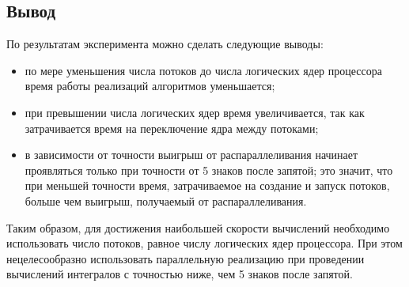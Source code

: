\clearpage

\subsection*{Вывод}
По результатам эксперимента можно сделать следующие выводы:
\begin{itemize}[label=---]
    \item по мере уменьшения числа потоков до числа логических ядер процессора время работы реализаций алгоритмов уменьшается;
    \item при превышении числа логических ядер время увеличивается, так как затрачивается время на переключение ядра между потоками;
    \item в зависимости от точности выигрыш от распараллеливания начинает проявляться только при точности от 5 знаков после запятой; это значит, что при меньшей точности время, затрачиваемое на создание и запуск потоков, больше чем выигрыш, получаемый от распараллеливания.
\end{itemize}

Таким образом, для достижения наибольшей скорости вычислений необходимо использовать число потоков, равное числу логических ядер процессора. При этом нецелесообразно использовать параллельную реализацию при проведении вычислений интегралов с точностью ниже, чем 5 знаков после запятой. 